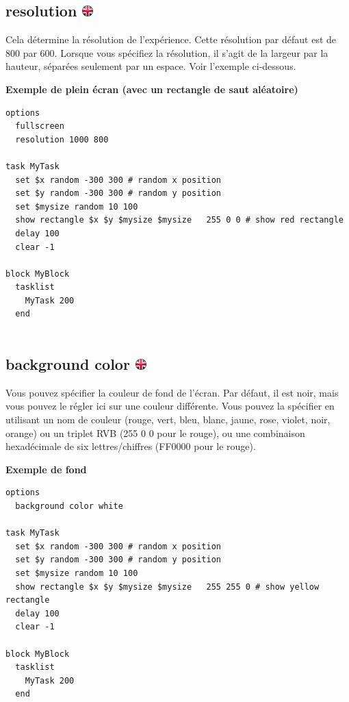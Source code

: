 \documentclass[
]{book}
\begin{document}
\hypertarget{resolution}{%
\subsection[resolution ]{\texorpdfstring{resolution
\href{https://www.psytoolkit.org/doc3.2.0/syntax.html\#options-resolution}{\protect\includegraphics{img/ukflag.png}}}{resolution }}\label{resolution}}

Cela détermine la résolution de l'expérience. Cette résolution par
défaut est de 800 par 600. Lorsque vous spécifiez la résolution, il
s'agit de la largeur par la hauteur, séparées seulement par un espace.
Voir l'exemple ci-dessous.

\textbf{Exemple de plein écran (avec un rectangle de saut aléatoire)}

\begin{verbatim}
options
  fullscreen
  resolution 1000 800

task MyTask
  set $x random -300 300 # random x position
  set $y random -300 300 # random y position
  set $mysize random 10 100
  show rectangle $x $y $mysize $mysize   255 0 0 # show red rectangle
  delay 100
  clear -1

block MyBlock
  tasklist
    MyTask 200
  end
  
\end{verbatim}

\hypertarget{background-color}{%
\subsection[background color ]{\texorpdfstring{background color
\href{https://www.psytoolkit.org/doc3.2.0/syntax.html\#options-background}{\protect\includegraphics{img/ukflag.png}}}{background color }}\label{background-color}}

Vous pouvez spécifier la couleur de fond de l'écran. Par défaut, il est
noir, mais vous pouvez le régler ici sur une couleur différente. Vous
pouvez la spécifier en utilisant un nom de couleur (rouge, vert, bleu,
blanc, jaune, rose, violet, noir, orange) ou un triplet RVB (255 0 0
pour le rouge), ou une combinaison hexadécimale de six lettres/chiffres
(FF0000 pour le rouge).

\textbf{Exemple de fond}

\begin{verbatim}
options
  background color white

task MyTask
  set $x random -300 300 # random x position
  set $y random -300 300 # random y position
  set $mysize random 10 100
  show rectangle $x $y $mysize $mysize   255 255 0 # show yellow rectangle
  delay 100
  clear -1

block MyBlock
  tasklist
    MyTask 200
  end
  
\end{verbatim}
\end{document}
